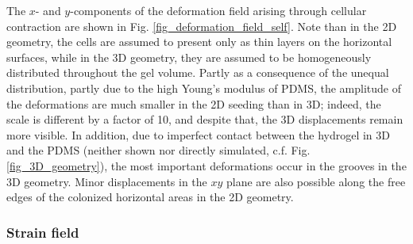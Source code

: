\documentclass[11pt]{amsart}
\begin{document}
\begin{figure}
\end{figure}

The $x$- and $y$-components of the deformation field arising through cellular contraction are shown in Fig. \ref{fig_deformation_field_self}. Note than in the 2D geometry, the cells are assumed to present only as thin layers on the horizontal surfaces, while in the 3D geometry, they are assumed to be homogeneously distributed throughout the gel volume. Partly as a consequence of the unequal distribution, partly due to the high Young's modulus of PDMS, the amplitude of the deformations are much smaller in the 2D seeding than in 3D; indeed, the scale is different by a factor of 10, and despite that, the 3D displacements remain more visible. In addition, due to imperfect contact between the hydrogel in 3D and the PDMS (neither shown nor directly simulated, c.f. Fig. \ref{fig_3D_geometry}), the most important deformations occur in the grooves in the 3D geometry. Minor displacements in the $xy$ plane are also possible along the free edges of the colonized horizontal areas in the 2D geometry.



\subsubsection{Strain field}
\end{document}
